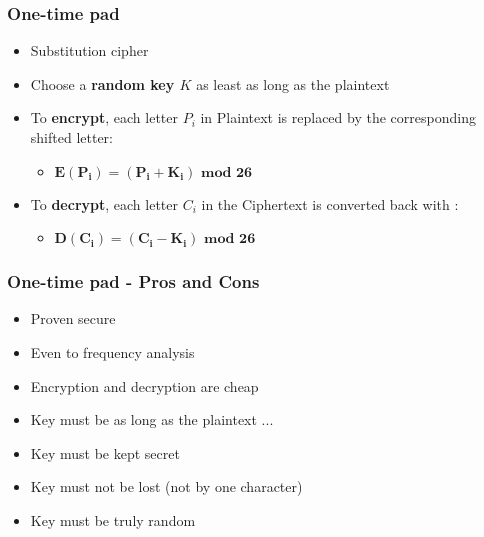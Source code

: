 \documentclass[
hyperref={pdfpagelabels=false}
,xcolor=table
]
{beamer}
\newcommand{\plus}{{\texttt{[image: plus.png]}}}
\newcommand{\minus}{{\texttt{[image: minus.png]}}}
\begin{document}
\begin{frame}
  \frametitle{One-time pad}
  \begin{itemize}
  \item Substitution cipher
  \item Choose a \textbf{random key $K$} as least as long as the plaintext
  \item To \textbf{encrypt}, each letter $P_i$ in Plaintext is replaced by the corresponding shifted letter:
    \begin{itemize}
    \item[] $\bm{E(P_i) = (P_i + K_i) \mbox{ mod } 26}$
    \end{itemize}
  \item To \textbf{decrypt}, each letter $C_i$ in the Ciphertext is converted back with :
    \begin{itemize}
    \item[] $\bm{D(C_i) = (C_i - K_i) \mbox{ mod } 26}$ 
    \end{itemize} 
  \end{itemize}
  
\end{frame}


\begin{frame}
  \frametitle{One-time pad - Pros and Cons}

  \begin{itemize}
  \item[\plus] Proven secure
  \item[\plus] Even to frequency analysis
  \item[\plus] Encryption and decryption are cheap
  \item[\minus] Key must be as long as the plaintext ... 
  \item[\minus] Key must be kept secret
  \item[\minus] Key must not be lost (not by one character)  
  \item[\minus] Key must be truly random 
  \end{itemize}
\end{frame}

  
\end{document}

